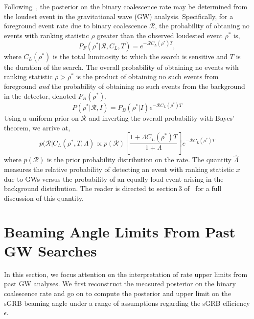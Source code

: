\documentclass[twocolumn,nofootinbib]{revtex4-1}
\newcommand{\cbcrate}{{{\mathcal R}}}
\newcommand{\rhostar}{{\rho^*}}
\def\gw#1{gravitational wave#1 (GW#1)\gdef\gw{GW}}
\begin{document}
Following~\cite{Biswas09,BradyFairhurst08}, the posterior on the binary
coalescence rate may be determined from the loudest event in the \gw{}
analysis.  Specifically, for a foreground event rate due to  binary coalescence
$\cbcrate$, the probability of obtaning no events with ranking statistic $\rho$
greater than the observed loudested event $\rhostar$ is,
%
\begin{equation}
P_F(\rhostar | \cbcrate, C_L, T) = e^{-\cbcrate C_L(\rhostar) T},
\end{equation}
%
where $C_L(\rhostar)$ is the total luminosity to which the search is sensitive
and $T$ is the duration of the search.  The overall probability of obtaining
no events with ranking statistic $\rho>\rhostar$ is the product of obtaining
no such events from foreground \emph{and} the probability of obtaining no such
events from the background in the detector, denoted $P_B(\rhostar)$,
%
\begin{equation}
P(\rhostar|\cbcrate,I) = P_B(\rhostar|I)e^{-\cbcrate C_L(\rhostar) T}
\end{equation}
%
Using a uniform prior on $\cbcrate$ and inverting the overall probability with
Bayes' theorem, we arrive at,
%
\begin{equation}\label{eq:loudestEventPosterior}
p(\cbcrate | C_L({\rhostar}, T, \Lambda) \propto p(\cbcrate) \left[ \frac{1+\Lambda
C_L(\rhostar) T}{1+\Lambda}\right] e^{-\cbcrate C_L(\rhostar) T}
\end{equation}
%
where $p(\cbcrate)$ is the prior probability distribution on the rate.  The
quantity $\hat{\Lambda}$ measures the relative probability of detecting an event
with ranking statistic $x$ due to \gw{s} versus the probability of an equally loud
event arising in the background distribution.  The reader is directed to
section\,3 of~\cite{BradyFairhurst08} for a full discussion of this quantity.


\section{Beaming Angle Limits From Past GW Searches}

In this section, we focus attention on the interpretation of rate upper limits
from past \gw{} analyses.  We first reconstruct the measured posterior on the
binary coalescence rate and go on to compute the posterior and upper limit on
the sGRB beaming angle under a range of assumptions regarding the sGRB
efficiency $\epsilon$.
\end{document}
